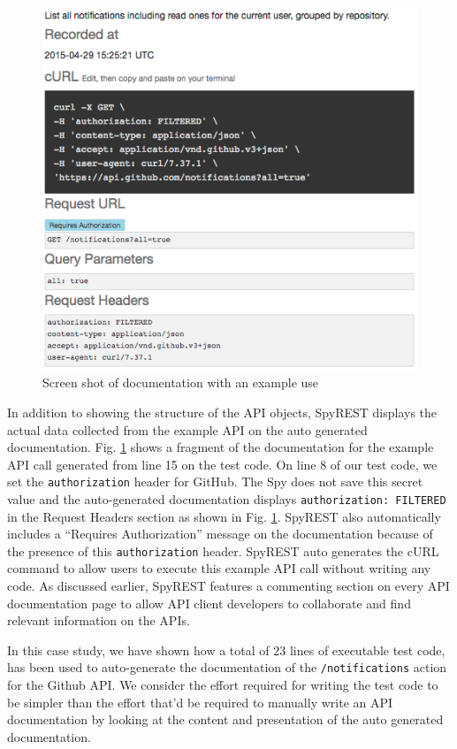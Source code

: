 \documentclass[conference]{IEEEtran}
\begin{document}
\begin{figure}[!tbh]
  \centering
  \includegraphics[width=\linewidth]{notification_example.png}
  \caption{Screen shot of documentation with an example use}
  \label{fig:notification_example}
\end{figure}

In addition to showing the structure of the API objects, SpyREST displays the actual data collected from the example API on the auto generated documentation. Fig. \ref{fig:notification_example} shows a fragment of the documentation for the example API call generated from line 15 on the test code. On line 8 of our test code, we set the \texttt{authorization} header for GitHub. The Spy does not save this secret value and the auto-generated documentation displays \texttt{authorization: FILTERED} in the Request Headers section as shown in Fig. \ref{fig:notification_example}. SpyREST also automatically includes a ``Requires Authorization'' message on the documentation because of the presence of this \texttt{authorization} header. SpyREST auto generates the cURL command to allow users to execute this example API call without writing any code. As discussed earlier, SpyREST features a commenting section on every API documentation page to allow API client developers to collaborate and find relevant information on the APIs.

In this case study, we have shown how a total of 23 lines of executable test code, has been used to auto-generate the documentation of the \texttt{/notifications} action for the Github API. We consider the effort required for writing the test code to be simpler than the effort that'd be required to manually write an API documentation by looking at the content and presentation of the auto generated documentation.
\end{document}
